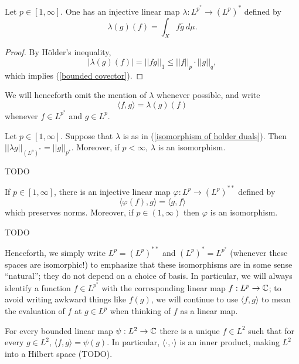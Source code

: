 \begin{lemma}
Let $p \in [1, \infty]$.
One has an injective linear map $\lambda: L^{p^{*}} \to {(L^{p})}^{*}$ defined by
\begin{equation}\label{isomorphism of holder duals}
\lambda(g)(f) = \int_{X} f\overline g ~d\mu.
\end{equation}
\end{lemma}
\begin{proof}
By H\"older's inequality,
\[|\lambda(g)(f)| = ||fg||_{1} \leq ||f||_{p}  \cdot ||g||_{q},\]
which implies (\ref{bounded covector}).
\end{proof}

We will henceforth omit the mention of $\lambda$ whenever possible, and write
\[\langle f, g\rangle = \lambda(g)(f)\]
whenever $f \in L^{p^{*}}$ and $g \in L^{p}$.

\begin{theorem}
Let $p \in [1, \infty]$.
Suppose that $\lambda$ is as in (\ref{isomorphism of holder duals}).
Then $||\lambda g||_{{(L^{p})}^{*}} = ||g||_{p^{*}}$.
Moreover, if $p < \infty$, $\lambda$ is an isomorphism.
\end{theorem}
TODO

\begin{corollary}
If $p \in [1, \infty]$, there is an injective linear map $\varphi: L^{p} \to {(L^{p})}^{**}$ defined by
\[\langle \varphi(f), g\rangle = \langle g, f\rangle\]
which preserves norms. Moreover, if $p \in (1, \infty)$ then $\varphi$ is an isomorphism.
\end{corollary}
TODO

Henceforth, we simply write $L^{p} = {(L^{p})}^{**}$ and ${(L^{p})}^{*} = L^{p^{*}}$ (whenever these spaces are isomorphic!) to emphasize that these isomorphisms are in some sense ``natural''; they do not depend on a choice of basis.
In particular, we will always identify a function $f \in L^{p^{*}}$ with the corresponding linear map $f: L^{p} \to \mathbb{C}$; to avoid writing awkward things like $f(g)$, we will continue to use $\langle f, g\rangle$ to mean the evaluation of $f$ at $g \in L^{p}$ when thinking of $f$ as a linear map.

\begin{corollary}
For every bounded linear map $\psi: L^{2} \to \mathbb{C}$ there is a unique $f \in L^{2}$ such that for every $g \in L^{2}$, $\langle f, g\rangle = \psi(g)$.
In particular, $\langle \cdot, \cdot \rangle$ is an inner product, making $L^{2}$ into a Hilbert space (TODO).
\end{corollary}

